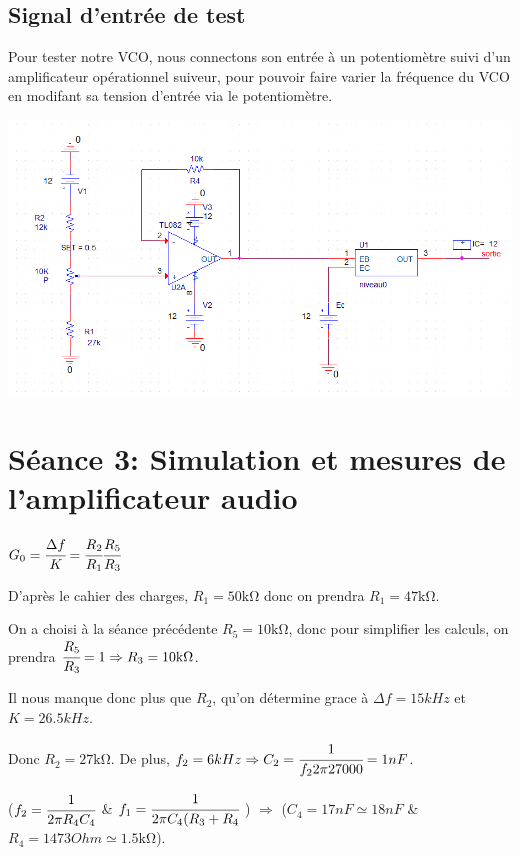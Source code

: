 \subsection{Signal d’entrée de test}

Pour tester notre VCO, nous connectons son entrée à un potentiomètre suivi d’un amplificateur opérationnel suiveur, pour pouvoir faire varier la fréquence du VCO en modifant sa tension d’entrée via le potentiomètre.

\includegraphics[width=\linewidth]{../img/schematic_test_vco.png}

\section{Séance 3: Simulation et mesures de l’amplificateur audio}


$G_0 = \cfrac{\Delta f}{K} = \cfrac{R_2}{R_1}\cfrac{R_5}{R_3}$

D’après le cahier des charges, $R_1 = 50 \si{\kilo\ohm}$ donc on prendra $R_1 = 47 \si{\kilo\ohm}$.

On a choisi à la séance précédente $R_5 = 10 \si{\kilo\ohm}$, donc pour simplifier les calculs, on prendra $\cfrac{R_5}{R_3} = 1 \Rightarrow R_3 = 10 \si{\kilo\ohm}$.

Il nous manque donc plus que $R_2$, qu’on détermine grace à $\Delta f = 15 kHz$ et $K = 26.5 kHz$.

Donc $R_2 = 27 \si{\kilo\ohm}$. De plus, $f_2 = 6 kHz \Rightarrow C_2 = \cfrac{1}{f_2 2 \pi 27000} = 1 nF$.

($f_2 = \cfrac{1}{2\pi R_4 C_4}$ \& $f_1 = \cfrac{1}{2\pi C_4(R_3 + R_4}$ ) $\Rightarrow$ ($C_4 = 17 nF \simeq 18nF$ \& $R_4 = 1473 Ohm \simeq 1.5 \si{\kilo\ohm}$).

